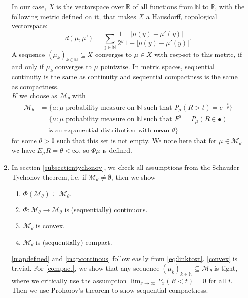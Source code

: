 \documentclass[12pt,a4paper]{scrartcl}
\numberwithin{equation}{section}
\newcommand{\R}{\mathbb{R}} %
\newcommand{\N}{\mathbb{N}} %
\begin{document}
\begin{enumerate}
In our case, $X$ is the vectorspace over $\R$ of all functions from $\N$ to $\R$, with the following metric defined on it, that makes $X$ a Hausdorff, topological vectorspace:
\begin{equation}
d\left(\mu, \mu'\right) = \sum_{y \in \N} \frac{1}{2^y} \frac{ \left|\mu\left(y\right) - \mu'\left(y\right) \right|}{1+\left|\mu\left(y\right) - \mu'\left(y\right) \right|}.
\end{equation}
A sequence $\left(\mu_k\right)_{k \in \N} \subseteq X$ converges to $\mu \in X$ with respect to this metric, if and only if $ \mu_k$ converges to $\mu$ pointwise. In metric spaces, sequential continuity is the same as continuity and sequential compactness is the same as compactness.\\[2ex]
$K$ we choose as $\mathcal{M}_{\theta}$ with
\begin{equation} \label{eq:mtheta}
\begin{aligned}
\mathcal{M}_{\theta} &= \lbrace  \mu : \mu \text{ probability measure on } \N \text{ such that } P_{\mu}\left(R>t\right) = e^{-\frac{t}{\theta}}\rbrace \\
&= \lbrace \mu: \mu \text{ probability measure on } \N \text{ such that } F^{\mu} = P_{\mu}\left(R \in \bullet\right) \\ 
&\ \ \ \ \text{ is an exponential distribution with mean } \theta \rbrace
\end{aligned}
\end{equation}
for some $\theta > 0$ such that this set is not empty. We note here that for $\mu \in \mathcal{M}_{\theta}$ we have $E_{\mu} R = \theta < \infty$, so $\Phi\mu$ is defined.
\item In section \ref{subsectiontychonov}, we check all assumptions from the Schauder-Tychonov theorem, i.e. if $\mathcal{M}_{\theta} \neq \emptyset$, then we show
\begin{enumerate}
\item \label{mapdefined} $\Phi\left(\mathcal{M}_{\theta}\right) \subseteq \mathcal{M}_{\theta}.$ \label{mapdefined}
\item \label{mapcontinous} $\Phi: \mathcal{M}_{\theta} \to \mathcal{M}_{\theta}$ is (sequentially) continuous. \label{mapcontinous}
\item \label{convex} $\mathcal{M}_{\theta}$ is convex. \label{convex}
\item \label{compact} $\mathcal{M}_{\theta}$ is (sequentially) compact. \label{compact}
\end{enumerate}
\eqref{mapdefined} and \eqref{mapcontinous} follow easily from \eqref{eq:linktoxt}. \eqref{convex} is trivial. For \eqref{compact}, we show that any sequence $\left(\mu_k\right)_{k \in \N} \subseteq \mathcal{M}_{\theta} $ is tight, where we critically use the assumption $\lim_{x \to \infty} P_x\left(R < t\right) = 0$ for all $t.$ Then we use Prohorov's theorem to show sequential compactness.

\end{enumerate}
\end{document}
